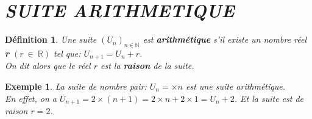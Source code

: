 \documentclass[a4paper, 12pt]{report}
\newtheorem{definition}{Définition}[section]
\newtheorem{exemple}{Exemple}[section]
\begin{document}
    \section{\textit{SUITE ARITHMETIQUE}}
        \begin{definition}
            Une suite $(U_n)_{n\in\mathbb{N}}$ est \textbf{arithmétique} s'il existe un nombre réel \textbf{r} $(r~\in~\mathbb{R})$ tel que:   
            $U_{n+1}=U_n+r$.\\ On dit alors que le réel $r$ est la \textbf{raison} de la suite.
        \end{definition}
        \begin{exemple}
            La suite de nombre pair: $U_n=\times n$ est une suite arithmétique.\\ 
            En effet, on a $U_{n+1}=2\times (n+1)=2\times n+2\times 1=U_n+2$. Et la suite est de raison $r=2$.
        \end{exemple}
\end{document}
